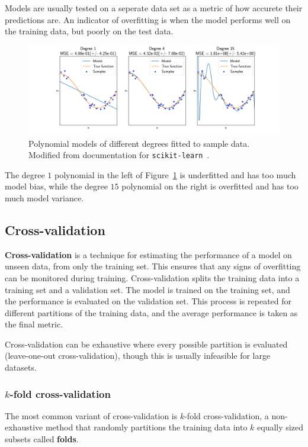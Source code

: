 \documentclass[12pt]{report}
\theoremstyle{definition}
\theoremstyle{remark}
\begin{document}
Models are usually tested on a seperate data set as a metric of how accurete their predictions are. An indicator of overfitting is when the model performs well on the training data, but poorly on the test data.

\begin{figure}
    \centering
    \includegraphics[width=\linewidth]{figs/underfitting_overfitting.png}
    \caption{Polynomial models of different degrees fitted to sample data. Modified from documentation for \texttt{scikit-learn}~\cite{pedregosa_scikit-learn_2011}.}
    \label{fig:overfitting}
\end{figure}

The degree $1$ polynomial in the left of Figure~\ref{fig:overfitting} is underfitted and has too much model bias, while the degree $15$ polynomial on the right is overfitted and has too much model variance.

\subsection{Cross-validation}
\textbf{Cross-validation} is a technique for estimating the performance of a model on unseen data, from only the training set. This ensures that any signs of overfitting can be monitored during training. Cross-validation splits the training data into a training set and a validation set. The model is trained on the training set, and the performance is evaluated on the validation set. This process is repeated for different partitions of the training data, and the average performance is taken as the final metric.

Cross-validation can be exhaustive where every possible partition is evaluated (leave-one-out cross-validation), though this is usually infeasible for large datasets.

\subsubsection{$k$-fold cross-validation}
The most common variant of cross-validation is $k$-fold cross-validation, a non-exhaustive method that randomly partitions the training data into $k$ equally sized subsets called \textbf{folds}.
\end{document}
